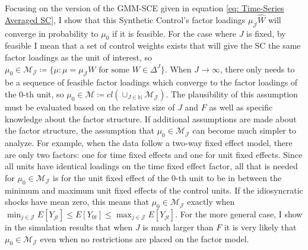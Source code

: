 \documentclass{article}
\begin{document}
 Focusing on the version of the GMM-SCE given in equation \eqref{eq: Time-Series Averaged SC}, I show that this Synthetic Control's factor loadings $\mu_{\mathcal{J}} \hat{W}$ will converge in probability to $\mu_0$ if it is feasible. For the case where $J$ is fixed, by feasible I mean that a set of control weights exists that will give the SC the same factor loadings as the unit of interest, so $\mu_0 \in \mathcal{M}_{\mathcal{J}} \coloneqq \{\mu : \mu = \mu_{\mathcal{J}} W \text{ for some } W \in \Delta^J \}$. When $J \rightarrow \infty$, there only needs to be a sequence of feasible factor loadings which converge to the factor loadings of the $0$-th unit, so $\mu_0 \in \mathcal{M} \coloneqq cl(\cup_{J \in \mathbb{N}} \mathcal{M}_{\mathcal{J}})$. The plausibility of this assumption must be evaluated based on the relative size of $J$ and $F$ as well as specific knowledge about the factor structure. If additional assumptions are made about the factor structure, the assumption that $\mu_0 \in \mathcal{M}_{\mathcal{J}}$ can become much simpler to analyze. For example, when the data follow a two-way fixed effect model, there are only two factors: one for time fixed effects and one for unit fixed effects. Since all units have identical loadings on the time fixed effect factor, all that is needed for $\mu_0 \in \mathcal{M}_{\mathcal{J}}$ is for the unit fixed effect of the $0$-th unit to be in between the minimum and maximum unit fixed effects of the control units. If the idiosyncratic shocks have mean zero, this means that $\mu_0 \in \mathcal{M}_{\mathcal{J}}$ exactly when $\min_{j\in \mathcal{J}} E[Y_{jt}] \leq E[Y_{0t}] \leq \max_{j \in \mathcal{J}} E[Y_{jt}]$. For the more general case, I show in the simulation results that when $J$ is much larger than $F$ it is very likely that $\mu_0 \in \mathcal{M}_{\mathcal{J}}$ even when no restrictions are placed on the factor model.
\end{document}
